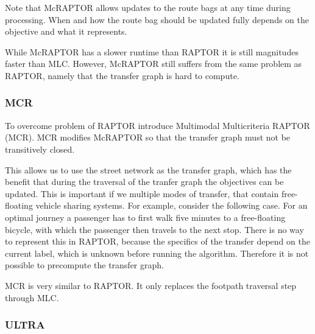 Note that McRAPTOR allows updates to the route bags at any time during processing.
When and how the route bag should be updated fully depends on the objective and what it represents.

While McRAPTOR has a slower runtime than RAPTOR it is still magnitudes faster than MLC.
However, McRAPTOR still suffers from the same problem as RAPTOR, namely that the transfer graph is hard to compute.


\subsubsection{MCR}
\label{subsubsec:mcr}


To overcome problem of RAPTOR \cite{dellingComputingMultimodalJourneys2013} introduce Multimodal Multicriteria RAPTOR (MCR).
MCR modifies McRAPTOR so that the transfer graph must not be transitively closed.

This allows us to use the street network as the transfer graph, which has the benefit that during the traversal of the tranfer graph the objectives can be updated.
This is important if we multiple modes of transfer, that contain free-floating vehicle sharing systems.
For example, consider the following case.
For an optimal journey a passenger has to first walk five minutes to a free-floating bicycle, with which the passenger then travels to the next stop.
There is no way to represent this in RAPTOR, because the specifics of the transfer depend on the current label, which is unknown before running the algorithm.
Therefore it is not possible to precompute the transfer graph.

MCR is very similar to RAPTOR.
It only replaces the footpath traversal step through MLC.

\subsubsection{ULTRA}
\label{subsubsec:ultra}
